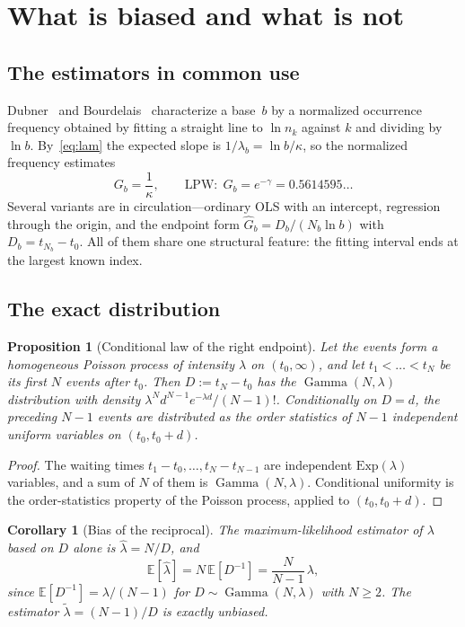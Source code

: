 \documentclass[11pt,a4paper]{article}
\theoremstyle{plain}
\newtheorem{proposition}{Proposition}
\newtheorem{corollary}{Corollary}
\theoremstyle{remark}
\newcommand{\emg}{e^{-\gamma}}
\DeclareMathOperator{\Gam}{Gamma}
\begin{document}
\section{What is biased and what is not}\label{sec:notbias}

\subsection{The estimators in common use}
Dubner~\cite{dubner1993} and Bourdelais~\cite{bourdelais2009} characterize a
base~$b$ by a normalized occurrence frequency obtained by fitting a straight
line to $\ln n_k$ against $k$ and dividing by $\ln b$. By~\eqref{eq:lam} the
expected slope is $1/\lambda_b=\ln b/\kappa$, so the normalized frequency
estimates
\begin{equation}\label{eq:G}
G_b=\frac{1}{\kappa},\qquad\text{LPW:}\ \ G_b=\emg=0.5614595\ldots
\end{equation}
Several variants are in circulation---ordinary OLS with an intercept, regression
through the origin, and the endpoint form $\hat G_b=D_b/(N_b\ln b)$ with
$D_b=t_{N_b}-t_0$. All of them share one structural feature: the fitting
interval ends at the largest known index.

\subsection{The exact distribution}

\begin{proposition}[Conditional law of the right endpoint]\label{prop:gamma}
Let the events form a homogeneous Poisson process of intensity $\lambda$ on
$(t_0,\infty)$, and let $t_1<\dots<t_N$ be its first $N$ events after $t_0$.
Then $D:=t_N-t_0$ has the $\Gam(N,\lambda)$ distribution with density
$\lambda^{N}d^{N-1}e^{-\lambda d}/(N-1)!$. Conditionally on $D=d$, the preceding
$N-1$ events are distributed as the order statistics of $N-1$ independent
uniform variables on $(t_0,t_0+d)$.
\end{proposition}

\begin{proof}
The waiting times $t_1-t_0,\dots,t_N-t_{N-1}$ are independent
$\mathrm{Exp}(\lambda)$ variables, and a sum of $N$ of them is
$\Gam(N,\lambda)$. Conditional uniformity is the order-statistics property of
the Poisson process, applied to $(t_0,t_0+d)$.
\end{proof}

\begin{corollary}[Bias of the reciprocal]\label{cor:kappa}
The maximum-likelihood estimator of $\lambda$ based on $D$ alone is
$\hat\lambda=N/D$, and
\begin{equation}\label{eq:bias}
\mathbb E[\hat\lambda]=N\,\mathbb E[D^{-1}]=\frac{N}{N-1}\,\lambda,
\end{equation}
since $\mathbb E[D^{-1}]=\lambda/(N-1)$ for $D\sim\Gam(N,\lambda)$ with $N\ge2$.
The estimator $\tilde\lambda=(N-1)/D$ is exactly unbiased.
\end{corollary}
\end{document}
